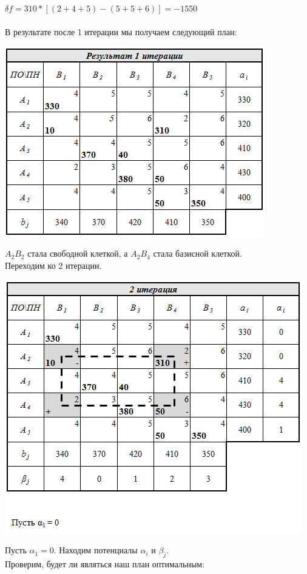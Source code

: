 \documentclass[14pt,a4paper,fleqn]{extarticle}
\begin{document}
$\delta f = 310*[(2+4+5)-(5+5+6)] = -1550$\\\\
В результате после 1 итерации мы получаем следующий план:
\begin{center}
	\includegraphics[scale=0.5]{17}
\end{center}
$A_2B_2$ стала свободной клеткой, а $A_2B_4$ стала базисной клеткой.\\
Переходим ко 2 итерации.\\
\begin{center}
	\includegraphics[scale=0.5]{18}
\end{center}
\newpage
Пусть $\alpha_1 = 0$. Находим потенциалы $\alpha_i$ и $\beta_j$.\\
Проверим, будет ли являться наш план оптимальным:\\
\end{document}
